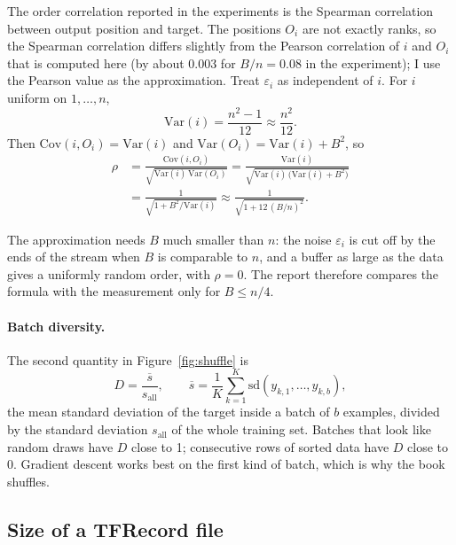 The order correlation reported in the experiments is the Spearman correlation between output position and target. The positions $O_i$ are not exactly ranks, so the Spearman correlation differs slightly from the Pearson correlation of $i$ and $O_i$ that is computed here (by about 0.003 for $B/n = 0.08$ in the experiment); I use the Pearson value as the approximation. Treat $\varepsilon_i$ as independent of $i$. For $i$ uniform on $1,\dots,n$,
\begin{equation}
\mathrm{Var}(i) = \frac{n^{2}-1}{12} \approx \frac{n^{2}}{12} .
\end{equation}
Then $\mathrm{Cov}(i, O_i) = \mathrm{Var}(i)$ and $\mathrm{Var}(O_i) = \mathrm{Var}(i) + B^{2}$, so
\begin{equation}
\begin{aligned}
\rho &= \frac{\mathrm{Cov}(i, O_i)}{\sqrt{\mathrm{Var}(i)\,\mathrm{Var}(O_i)}}
= \frac{\mathrm{Var}(i)}{\sqrt{\mathrm{Var}(i)\,\bigl(\mathrm{Var}(i) + B^{2}\bigr)}} \\
&= \frac{1}{\sqrt{1 + B^{2}/\mathrm{Var}(i)}}
\approx \frac{1}{\sqrt{1 + 12\,(B/n)^{2}}} .
\end{aligned}
\end{equation}

The approximation needs $B$ much smaller than $n$: the noise $\varepsilon_i$ is cut off by the ends of the stream when $B$ is comparable to $n$, and a buffer as large as the data gives a uniformly random order, with $\rho = 0$. The report therefore compares the formula with the measurement only for $B \le n/4$.

\paragraph{Batch diversity.} The second quantity in Figure~\ref{fig:shuffle} is
\begin{equation}
D = \frac{\overline{s}}{s_{\mathrm{all}}}, \qquad
\overline{s} = \frac{1}{K}\sum_{k=1}^{K} \mathrm{sd}(y_{k,1},\dots,y_{k,b}),
\end{equation}
the mean standard deviation of the target inside a batch of $b$ examples, divided by the standard deviation $s_{\mathrm{all}}$ of the whole training set. Batches that look like random draws have $D$ close to 1; consecutive rows of sorted data have $D$ close to 0. Gradient descent works best on the first kind of batch, which is why the book shuffles.

\subsection{Size of a TFRecord file}


